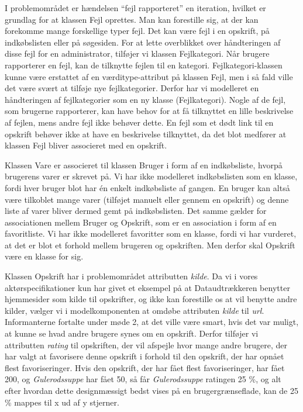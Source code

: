 I problemområdet er hændelsen ``fejl rapporteret'' en iteration, hvilket er grundlag for at klassen Fejl oprettes. Man kan forestille sig, at der kan forekomme mange forskellige typer fejl. Det kan være fejl i en opskrift, på indkøbslisten eller på søgesiden. For at lette overblikket over håndteringen af disse fejl for en administrator, tilføjer vi klassen Fejlkategori. Når brugere rapporterer en fejl, kan de tilknytte fejlen til en kategori. Fejlkategori-klassen kunne være erstattet af en værditype-attribut på klassen Fejl, men i så fald ville det være svært at tilføje nye fejlkategorier. Derfor har vi modelleret en håndteringen af fejlkategorier som en ny klasse (Fejlkategori). Nogle af de fejl, som brugerne rapporterer, kan have behov for at få tilknyttet en lille beskrivelse af fejlen, mens andre fejl ikke behøver dette. En fejl som \fx et dødt link til en opskrift behøver ikke at have en beskrivelse tilknyttet, da det blot medfører at klassen Fejl bliver associeret med en opskrift.

Klassen Vare er associeret til klassen Bruger i form af en indkøbsliste, hvorpå brugerens varer er skrevet på. Vi har ikke modelleret indkøbslisten som en klasse, fordi hver bruger blot har én enkelt indkøbsliste af gangen. En bruger kan altså være tilkoblet mange varer (tilføjet manuelt eller gennem en opskrift) og denne liste af varer bliver dermed gemt på indkøbslisten. Det samme gælder for associationen mellem Bruger og Opskrift, som er en association i form af en favoritliste. Vi har ikke modelleret favoritter som en klasse, fordi vi har vurderet, at det er blot et forhold mellem brugeren og opskriften. Men derfor skal Opskrift være en klasse for sig.

Klassen Opskrift har i problemområdet attributten \textit{kilde}. Da vi i vores aktørspecifikationer kun har givet et eksempel på at Dataudtrækkeren benytter hjemmesider som kilde til opskrifter, og ikke kan forestille os at \Foodl{} vil benytte andre kilder, vælger vi i modelkomponenten at omdøbe attributen \textit{kilde} til \textit{url}. Informanterne fortalte under møde 2, at det ville være smart, hvis det var muligt, at kunne se hvad andre brugere synes om en opskrift. Derfor tilføjer vi attributten \textit{rating} til opskriften, der vil afspejle hvor mange andre brugere, der har valgt at favorisere denne opskrift i forhold til den opskrift, der har opnået flest favoriseringer. Hvis den opskrift, der har fået flest favoriseringer, har fået 200, og \textit{Gulerodssuppe} har fået 50, så får \textit{Gulerodssuppe} ratingen 25 \%, og alt efter hvordan dette designmæssigt bedst vises på en brugergrænseflade, kan de 25 \% mappes til \fx x ud af y stjerner.

